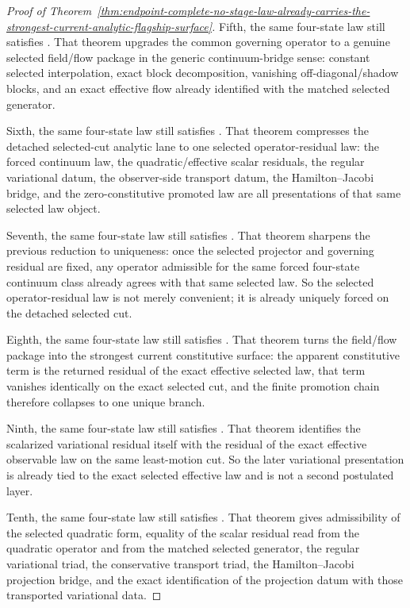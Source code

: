 \begin{proof}[Proof of Theorem~\ref{thm:endpoint-complete-no-stage-law-already-carries-the-strongest-current-analytic-flagship-surface}]
Fifth, the same four-state law still
satisfies
. That
theorem upgrades the common governing operator to a genuine selected
field/flow package in the generic continuum-bridge sense: constant selected
interpolation, exact block decomposition, vanishing off-diagonal/shadow
blocks, and an exact effective flow already identified with the matched
selected generator.

Sixth, the same four-state law still
satisfies
. That
theorem compresses the detached selected-cut analytic lane to one selected
operator-residual law: the forced continuum law, the quadratic/effective
scalar residuals, the regular variational datum, the observer-side transport
datum, the Hamilton--Jacobi bridge, and the zero-constitutive promoted law
are all presentations of that same selected law object.

Seventh, the same four-state law still
satisfies
.
That theorem sharpens the previous reduction to uniqueness: once the selected
projector and governing residual are fixed, any operator admissible for the
same forced four-state continuum class already agrees with that same selected
law. So the selected operator-residual law is not merely convenient; it is
already uniquely forced on the detached selected cut.

Eighth, the same four-state law still
satisfies
. That
theorem turns the field/flow package into the strongest current constitutive
surface: the apparent constitutive term is the returned residual of the exact
effective selected law, that term vanishes identically on the exact selected
cut, and the finite promotion chain therefore collapses to one unique branch.

Ninth, the same four-state law still
satisfies
.
That theorem identifies the scalarized variational residual itself with the
residual of the exact effective observable law on the same least-motion cut.
So the later variational presentation is already tied to the exact selected
effective law and is not a second postulated layer.

Tenth, the same four-state law still
satisfies
.
That theorem gives admissibility of the selected quadratic form, equality of
the scalar residual read from the quadratic operator and from the matched
selected generator, the regular variational triad, the conservative transport
triad, the Hamilton--Jacobi projection bridge, and the exact identification of
the projection datum with those transported variational data.


\end{proof}
